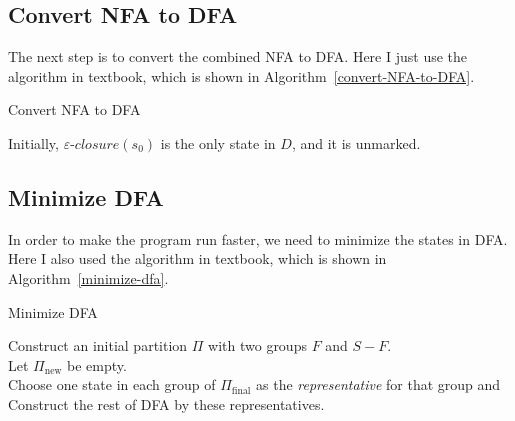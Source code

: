 \documentclass{article}
\begin{document}
\subsection{Convert NFA to DFA}

The next step is to convert the combined NFA to DFA. Here I just use the algorithm in textbook, which is shown in Algorithm~\ref{convert-NFA-to-DFA}.

\begin{algorithm}
    \caption{Convert NFA to DFA}
    \label{convert-NFA-to-DFA}
    Initially, $\varepsilon\text{-}closure(s_0)$ is the only state in $D$, and it is unmarked.\\
\end{algorithm}

\subsection{Minimize DFA}

In order to make the program run faster, we need to minimize the states in DFA. Here I also used the algorithm in textbook, which is shown in Algorithm~\ref{minimize-dfa}.

\begin{algorithm}
    \caption{Minimize DFA}
    \label{minimize-dfa}
    Construct an initial partition $\Pi$ with two groups $F$ and $S-F$.\\
    Let $\Pi_\text{new}$ be empty.\\
    Choose one state in each group of $\Pi_\text{final}$ as the \textit{representative} for that group and Construct the rest of DFA by these representatives.\\
\end{algorithm}
\end{document}
